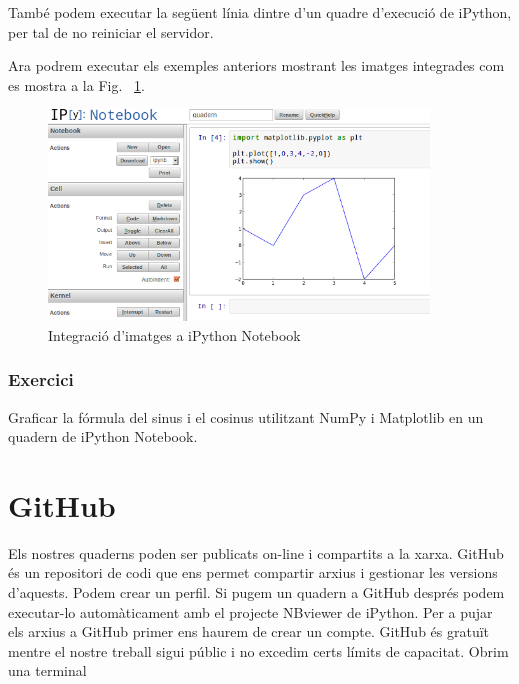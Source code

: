 
També podem executar la següent línia dintre d'un quadre d'execució de iPython, per tal de no reiniciar el servidor.
\begin{blockcode}
\end{blockcode}


Ara podrem executar els exemples anteriors mostrant les imatges integrades com es mostra a la Fig. ~\ref{fig:iimage}.


\begin{figure}[!h]
    \begin{centering}
    \includegraphics[width=0.9\textwidth]{img/iimage.png}
    \caption{Integració d'imatges a iPython Notebook}
    \label{fig:iimage}
    \end{centering}
\end{figure}




\subsubsection*{Exercici } 

Graficar la fórmula del sinus i el cosinus utilitzant NumPy i Matplotlib en un quadern de iPython Notebook.





\section{GitHub}

Els nostres quaderns poden ser publicats on-line i compartits a la xarxa. GitHub és un repositori de codi que ens permet compartir arxius i gestionar les versions d'aquests. Podem crear un perfil. Si pugem un quadern a GitHub després podem executar-lo automàticament amb el projecte NBviewer de iPython. Per a pujar els arxius a GitHub primer ens haurem de crear un compte. GitHub és gratuït mentre el nostre treball sigui públic i no excedim certs límits de capacitat. Obrim una terminal

